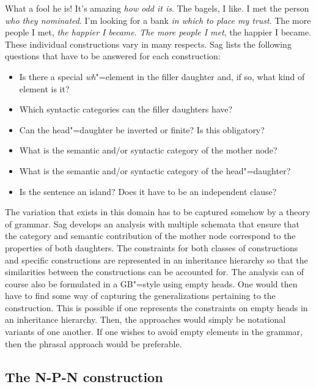 \begin{exe}
\begin{xlist}[iv.]
\begin{exe}
\begin{xlist}[iv.]
\eal
\ex What a fool he is!
\ex It's amazing \emph{how odd it is}.
\zl
\ea
The bagels, I like.
\z
\eal
\ex I met the person \emph{who they nominated}.
\ex I'm looking for a bank \emph{in which to place my trust}.
\zl
\eal
\ex The more people I met, \emph{the happier I became}.
\ex \emph{The more people I met}, the happier I became.
\zl
\largerpage
These individual constructions vary in many respects. Sag lists the following questions that have to be answered
for each construction:
\begin{itemize}
\item Is there a special \emph{wh}"=element in the filler daughter and, if so, what kind of element is it?
\item Which syntactic categories can the filler daughters have?
\item Can the head"=daughter be inverted or finite? Is this obligatory?
\item What is the semantic and/or syntactic category of the mother node?
\item What is the semantic and/or syntactic category of the head"=daughter?
\item Is the sentence an island? Does it have to be an independent clause?
\end{itemize}
The variation that exists in this domain has to be captured somehow by a theory of grammar. Sag develops an analysis with multiple schemata
that ensure that the category and semantic contribution of the mother node correspond to the properties of both daughters. The constraints for both classes of
constructions and specific constructions are represented in an inheritance hierarchy so that the similarities between the constructions can be
accounted for. The analysis can of course also be formulated in a GB"=style using empty heads. One would then have to find some way of capturing
the generalizations pertaining to the construction. This is possible if one represents the constraints on empty heads in an inheritance hierarchy. Then, the approaches
would simply be notational variants of one another. If one wishes to avoid empty elements in the grammar, then the phrasal approach would be preferable.

\subsection{The N-P-N construction}
\label{Abschnitt-NPN-Konstruktion}


\end{xlist}
\end{exe}
\end{xlist}
\end{exe}
